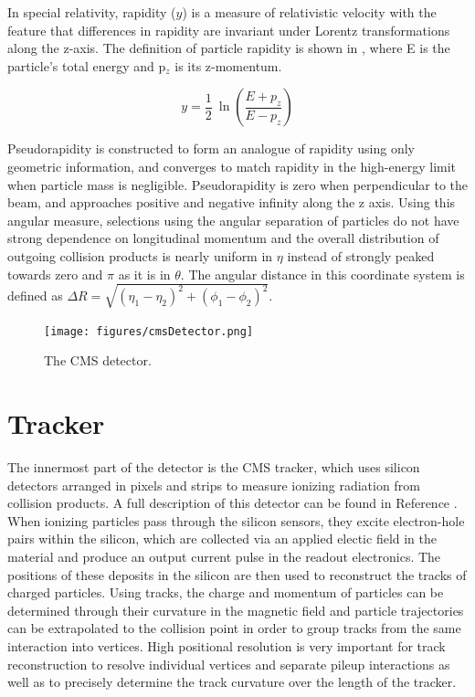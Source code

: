 In special relativity, rapidity ($y$) is a measure of relativistic velocity with the feature that differences in rapidity are invariant under Lorentz transformations along the z-axis.
The definition of particle rapidity is shown in , where E is the particle's total energy and p$_z$ is its z-momentum.

\begin{equation}
    \label{eq:rapidity}
    y = \frac{1}{2} ~\ln \left(\frac{E+p_z}{E-p_z}\right)
\end{equation}

Pseudorapidity is constructed to form an analogue of rapidity using only geometric information, and converges to match rapidity in the high-energy limit when particle mass is negligible.
Pseudorapidity is zero when perpendicular to the beam, and approaches positive and negative infinity along the z axis. 
Using this angular measure, selections using the angular separation of particles do not have strong dependence on longitudinal momentum and the overall distribution of outgoing collision products is nearly uniform in $\eta$ instead of strongly peaked towards zero and $\pi$ as it is in $\theta$.  
The angular distance in this coordinate system is defined as $\Delta R = \sqrt{(\eta_1-\eta_2)^2+(\phi_1-\phi_2)^2}$.

\begin{figure}[h]
    \texttt{[image: figures/cmsDetector.png]}
    \centering
    \caption{The CMS detector.}
    \label{fig:detector}
\end{figure}

\section{Tracker}
The innermost part of the detector is the CMS tracker, which uses silicon detectors arranged in pixels and strips to measure ionizing radiation from collision products. 
A full description of this detector can be found in Reference \cite{trackerTDR}.
When ionizing particles pass through the silicon sensors, they excite electron-hole pairs within the silicon, which are collected via an applied electic field in the material and produce an output current pulse in the readout electronics.
The positions of these deposits in the silicon are then used to reconstruct the tracks of charged particles.
Using tracks, the charge and momentum of particles can be determined through their curvature in the magnetic field and particle trajectories can be extrapolated to the collision point in order to group tracks from the same interaction into vertices. 
High positional resolution is very important for track reconstruction to resolve individual vertices and separate pileup interactions as well as to precisely determine the track curvature over the length of the tracker. 

